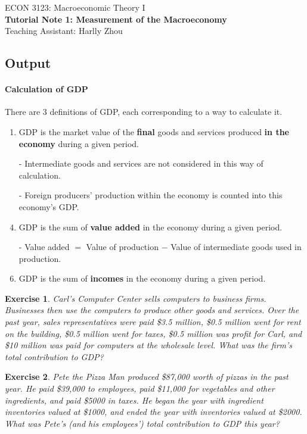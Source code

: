 \documentclass[12pt]{article}
\newtheorem{exercise}{Exercise}
\numberwithin{equation}{section}
\begin{document}
\begin{center}
    ECON 3123: Macroeconomic Theory I\\
    {\large \textbf{Tutorial Note 1: Measurement of the Macroeconomy}}\\
    Teaching Assistant: Harlly Zhou
\end{center}

\subsection*{Output}
\paragraph{Calculation of GDP}
There are 3 definitions of GDP, each corresponding to a way to calculate it.
\begin{enumerate}[label=(\arabic*)]
    \item GDP is the market value of the \textbf{final} goods and services produced \textbf{in the economy} during a given period.
    \item[-] Intermediate goods and services are not considered in this way of calculation.
    \item[-] Foreign producers' production within the economy is counted into this economy's GDP.
    
    \item GDP is the sum of \textbf{value added} in the economy during a given period.
    \item[-] Value added $=$ Value of production $-$ Value of intermediate goods used in production.

    \item GDP is the sum of \textbf{incomes} in the economy during a given period.
\end{enumerate}

\begin{exercise}
    Carl's Computer Center sells computers to business firms. Businesses then use the computers to produce other goods and services. Over the past year, sales representatives were paid \$3.5 million, \$0.5 million went for rent on the building, \$0.5 million went for taxes, \$0.5 million was profit for Carl, and \$10 million was paid for computers at the wholesale level. What was the firm's total contribution to GDP?
\end{exercise}

\begin{exercise}
    Pete the Pizza Man produced \$87,000 worth of pizzas in the past year. He paid \$39,000 to employees, paid \$11,000 for vegetables and other ingredients, and paid \$5000 in taxes. He began the year with ingredient inventories valued at \$1000, and ended the year with inventories valued at \$2000. What was Pete's (and his employees') total contribution to GDP this year?
\end{exercise}
\end{document}
